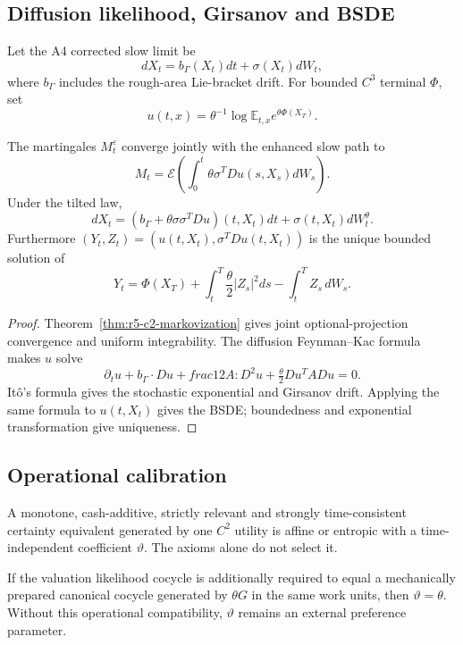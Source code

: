 \subsection{Diffusion likelihood, Girsanov and BSDE}

Let the A4 corrected slow limit be
\[
 dX_t=b_\Gamma(X_t)dt+\sigma(X_t)dW_t,
\]
where \(b_\Gamma\) includes the rough-area Lie-bracket drift.  For bounded
\(C^3\) terminal \(\Phi\), set
\[
 u(t,x)=\theta^{-1}\log
 \mathbb E_{t,x}e^{\theta\Phi(X_T)}.
\]

\begin{theorem}
\label{thm:r5-c2-girsanov}
The martingales \(M_t^\varepsilon\) converge jointly with the enhanced slow
path to
\[
 M_t=\mathcal E\left(
 \int_0^t\theta\sigma^TDu(s,X_s)dW_s
 \right).
\]
Under the tilted law,
\[
 dX_t=(b_\Gamma+\theta\sigma\sigma^TDu)(t,X_t)dt
      +\sigma(t,X_t)dW_t^\theta.
\]
Furthermore
\((Y_t,Z_t)=(u(t,X_t),\sigma^TDu(t,X_t))\) is the unique bounded solution of
\[
 Y_t=\Phi(X_T)+\int_t^T\frac\theta2|Z_s|^2ds
 -\int_t^TZ_s\,dW_s.
\]
\end{theorem}

\begin{proof}
Theorem~\ref{thm:r5-c2-markovization} gives joint optional-projection
convergence and uniform integrability.  The diffusion Feynman--Kac formula
makes \(u\) solve
\[
 \partial_tu+b_\Gamma\cdot Du+	frac12A:D^2u
 +\tfrac\theta2Du^TADu=0.
\]
It\^o's formula gives the stochastic exponential and Girsanov drift.  Applying
the same formula to \(u(t,X_t)\) gives the BSDE; boundedness and exponential
transformation give uniqueness.
\end{proof}

\subsection{Operational calibration}

A monotone, cash-additive, strictly relevant and strongly time-consistent
certainty equivalent generated by one \(C^2\) utility is affine or entropic
with a time-independent coefficient \(\vartheta\).  The axioms alone do not
select it.

\begin{theorem}
\label{thm:r5-c2-calibration}
If the valuation likelihood cocycle is additionally required to equal a
mechanically prepared canonical cocycle generated by \(\theta G\) in the same
work units, then \(\vartheta=\theta\).  Without this operational compatibility,
\(\vartheta\) remains an external preference parameter.
\end{theorem}

